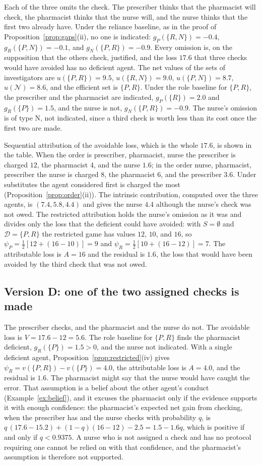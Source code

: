 \documentclass[11pt]{article}
\newcommand{\N}{\mathcal N}
\newcommand{\Dfc}{\mathcal D}
\theoremstyle{plain}
\theoremstyle{definition}
\begin{document}
Each of the three omits the check. The prescriber thinks that the pharmacist will check, the pharmacist thinks that the nurse will, and the nurse thinks that the first two already have. Under the reliance baseline, as in the proof of Proposition~\ref{prop:gaps}(ii), no one is indicated: $g_P(\{R,N\})=-0.4$, $g_R(\{P,N\})=-0.1$, and $g_N(\{P,R\})=-0.9$. Every omission is, on the supposition that the others check, justified, and the loss $17.6$ that three checks would have avoided has no deficient agent. The net values of the sets of investigators are $u(\{P,R\})=9.5$, $u(\{R,N\})=9.0$, $u(\{P,N\})=8.7$, $u(\N)=8.6$, and the efficient set is $\{P,R\}$. Under the role baseline for $\{P,R\}$, the prescriber and the pharmacist are indicated, $g_P(\{R\})=2.0$ and $g_R(\{P\})=1.5$, and the nurse is not, $g_N(\{P,R\})=-0.9$. The nurse's omission is of type N, not indicated, since a third check is worth less than its cost once the first two are made.

Sequential attribution of the avoidable loss, which is the whole $17.6$, is shown in the table. When the order is prescriber, pharmacist, nurse the prescriber is charged $12$, the pharmacist $4$, and the nurse $1.6$; in the order nurse, pharmacist, prescriber the nurse is charged $8$, the pharmacist $6$, and the prescriber $3.6$. Under substitutes the agent considered first is charged the most (Proposition~\ref{prop:order}(ii)). The intrinsic contribution, computed over the three agents, is $(7.4,5.8,4.4)$ and gives the nurse $4.4$ although the nurse's check was not owed. The restricted attribution holds the nurse's omission as it was and divides only the loss that the deficient could have avoided: with $S=\emptyset$ and $\Dfc=\{P,R\}$ the restricted game has values $12$, $10$, and $16$, so $\psi_P=\tfrac12[12+(16-10)]=9$ and $\psi_R=\tfrac12[10+(16-12)]=7$. The attributable loss is $A=16$ and the residual is $1.6$, the loss that would have been avoided by the third check that was not owed.

\subsection*{Version D: one of the two assigned checks is made}

The prescriber checks, and the pharmacist and the nurse do not. The avoidable loss is $V=17.6-12=5.6$. The role baseline for $\{P,R\}$ finds the pharmacist deficient, $g_R(\{P\})=1.5>0$, and the nurse not indicated. With a single deficient agent, Proposition~\ref{prop:restricted}(iv) gives $\psi_R=v(\{P,R\})-v(\{P\})=4.0$, the attributable loss is $A=4.0$, and the residual is $1.6$. The pharmacist might say that the nurse would have caught the error. That assumption is a belief about the other agent's conduct (Example~\ref{ex:belief}), and it excuses the pharmacist only if the evidence supports it with enough confidence: the pharmacist's expected net gain from checking, when the prescriber has and the nurse checks with probability $q$, is $q\,(17.6-15.2)+(1-q)(16-12)-2.5=1.5-1.6q$, which is positive if and only if $q<0.9375$. A nurse who is not assigned a check and has no protocol requiring one cannot be relied on with that confidence, and the pharmacist's assumption is therefore not supported.
\end{document}

